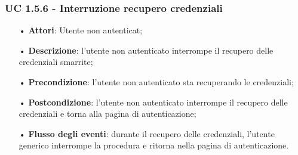 \subsubsection{UC 1.5.6 - Interruzione recupero credenziali}
\begin{itemize}
	\item[•]\textbf{Attori}: Utente non autenticat;
	\item[•]\textbf{Descrizione}: l'utente non autenticato interrompe il recupero delle credenziali smarrite;
	\item[•]\textbf{Precondizione}: l'utente non autenticato sta recuperando le credenziali;
	\item[•]\textbf{Postcondizione}: l'utente non autenticato interrompe il recupero delle credenziali e torna alla pagina di autenticazione;
	\item[•]\textbf{Flusso degli eventi}: durante il recupero delle credenziali, l'utente generico interrompe la procedura e ritorna nella pagina di autenticazione.
\end{itemize}


